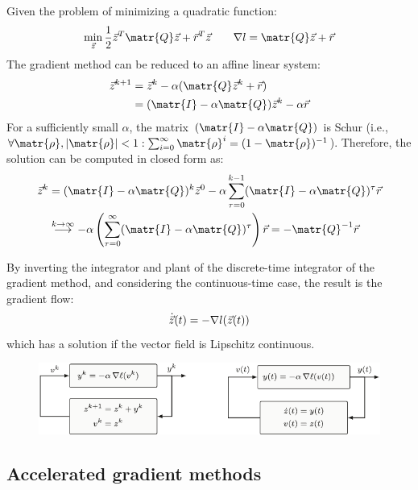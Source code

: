 \begin{remark} 
    Given the problem of minimizing a quadratic function:
    \[
        \min_{\z} \frac{1}{2}\z^T \matr{Q} \z + \vec{r}^T \z
        \qquad
        \nabla l = \matr{Q} \z + \vec{r}
    \]
    The gradient method can be reduced to an affine linear system:
    \[
        \begin{split}
            \z^{k+1} &= \z^k - \alpha (\matr{Q} \z^k + \vec{r}) \\
            &= (\matr{I} - \alpha \matr{Q}) \z^k - \alpha \vec{r}
        \end{split}
    \]
    For a sufficiently small $\alpha$, the matrix $(\matr{I} - \alpha \matr{Q})$ is Schur (i.e., $\forall \matr{\rho}, |\matr{\rho}| < 1: \sum_{i=0}^{\infty} \matr{\rho}^i = (1-\matr{\rho})^{-1}$). Therefore, the solution can be computed in closed form as:
    \[
        \begin{split}
            \z^k &= (\matr{I} - \alpha \matr{Q})^k \z^0 - \alpha \sum_{\tau=0}^{k-1} (\matr{I} - \alpha \matr{Q})^\tau \vec{r} \\
            &\overset{k \rightarrow \infty}{\longrightarrow} - \alpha \left( \sum_{\tau=0}^{\infty} (\matr{I} - \alpha \matr{Q})^\tau \right) \vec{r} = -\matr{Q}^{-1} \vec{r}
        \end{split}
    \]
\end{remark}

\begin{remark} 
    By inverting the integrator and plant of the discrete-time integrator of the gradient method, and considering the continuous-time case, the result is the gradient flow:
    \[
        \dot{{\vec{z}}}(t) = -\nabla l({\vec{z}}(t))
    \]
    which has a solution if the vector field is Lipschitz continuous.

    \begin{figure}[H]
        \centering
        \includegraphics[width=0.8\linewidth]{./img/_gradient_flow.pdf}
    \end{figure}
\end{remark}


\subsection{Accelerated gradient methods}

